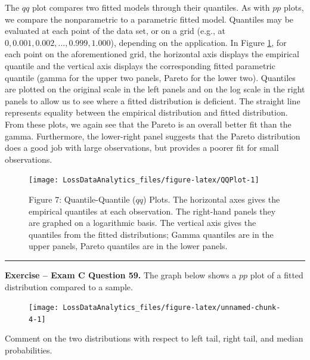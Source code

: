 \documentclass[]{book}
\theoremstyle{definition}
\theoremstyle{definition}
\theoremstyle{definition}
\theoremstyle{remark}
\begin{document}
The \(qq\) plot compares two fitted models through their quantiles. As
with \(pp\) plots, we compare the nonparametric to a parametric fitted
model. Quantiles may be evaluated at each point of the data set, or on a
grid (e.g., at \(0, 0.001, 0.002, \ldots, 0.999, 1.000\)), depending on
the application. In Figure \ref{fig:QQPlot}, for each point on the
aforementioned grid, the horizontal axis displays the empirical quantile
and the vertical axis displays the corresponding fitted parametric
quantile (gamma for the upper two panels, Pareto for the lower two).
Quantiles are plotted on the original scale in the left panels and on
the log scale in the right panels to allow us to see where a fitted
distribution is deficient. The straight line represents equality between
the empirical distribution and fitted distribution. From these plots, we
again see that the Pareto is an overall better fit than the gamma.
Furthermore, the lower-right panel suggests that the Pareto distribution
does a good job with large observations, but provides a poorer fit for
small observations.

\begin{figure}

{\centering \texttt{[image: LossDataAnalytics\_files/figure-latex/QQPlot-1]} 

}

\caption{Figure 7: Quantile-Quantile ($qq$) Plots. The horizontal axes gives the empirical quantiles at each observation. The right-hand panels they are graphed on a logarithmic basis. The vertical axis gives the quantiles from the fitted distributions; Gamma quantiles are in the upper panels, Pareto quantiles are in the lower panels.}\label{fig:QQPlot}
\end{figure}

\begin{center}\rule{0.5\linewidth}{\linethickness}\end{center}

\textbf{Exercise -- Exam C Question 59.} The graph below shows a \(pp\)
plot of a fitted distribution compared to a sample.

\begin{figure}

{\centering \texttt{[image: LossDataAnalytics\_files/figure-latex/unnamed-chunk-4-1]} 

}

\end{figure}

Comment on the two distributions with respect to left tail, right tail,
and median probabilities.
\end{document}
